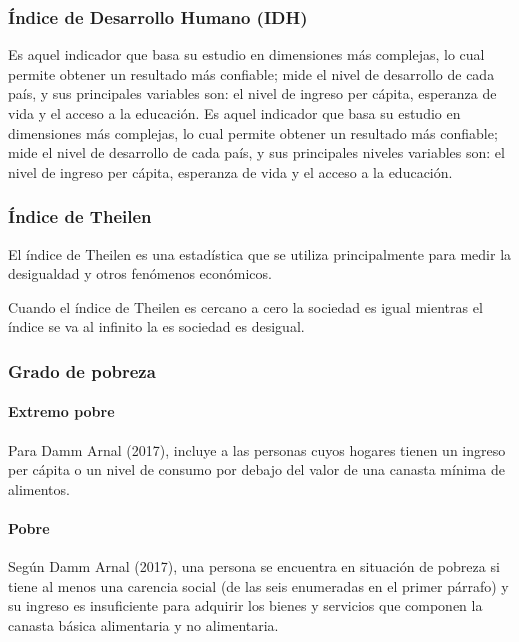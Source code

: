   \subsubsection{Índice de Desarrollo Humano (IDH)}
  
  Es aquel indicador que basa su estudio en dimensiones más complejas, lo cual permite obtener un resultado más confiable; mide el nivel de desarrollo de cada país, y sus principales variables son: el nivel de ingreso per cápita, esperanza de vida y el acceso a la educación. Es aquel indicador que basa su estudio en dimensiones más complejas, lo cual permite obtener un resultado más confiable; mide el nivel de desarrollo de cada país, y sus principales niveles variables son: el nivel de ingreso per cápita, esperanza de vida y el acceso a la educación. 
  
  \subsubsection{Índice de Theilen}
  
  El índice de Theilen es una estadística que se utiliza principalmente para medir la desigualdad y otros fenómenos económicos.
  
Cuando el índice de Theilen es cercano a cero la sociedad es igual mientras el índice se va al infinito la es sociedad es desigual. 


  \subsubsection{Grado de pobreza}
  
\paragraph{Extremo pobre} 
Para Damm Arnal (2017), incluye a las personas cuyos hogares tienen un ingreso per cápita o un nivel de consumo por debajo del valor de una canasta mínima de alimentos.

\paragraph{Pobre}

Según Damm Arnal (2017), una persona se encuentra en situación de pobreza si tiene al menos una carencia social (de las seis enumeradas en el primer párrafo) y su ingreso es insuficiente para adquirir los bienes y servicios que componen la canasta básica alimentaria y no alimentaria.



